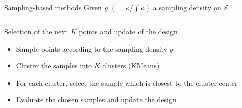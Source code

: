 \documentclass[10pt,aspectratio=169,usepdftitle=false]{beamer}
\newcommand{\Xspace}{\mathbb{X}}
\newcommand{\Prob}{\mathbb{P}}
\begin{document}
\begin{frame}{Sampling-based methods} %
    Given $g$ $(= \kappa / \int \kappa)$ a sampling density on  $\Xspace$ 
  \begin{columns}
    \begin{column}{0.5\textwidth}
    \begin{block}{Selection of the next $K$ points and update of the design}
      \begin{itemize}
      \item<2-> Sample points according to the sampling density $g$
      \item<3-> Cluster the samples into $K$ clusters (KMeans)
      \item<4-> For each cluster, select the sample which is closest to the cluster center
      \item<5-> Evaluate the chosen samples and update the design
      \end{itemize}
    \end{block}
    \end{column}
  \end{columns}
\end{frame}
\end{document}
